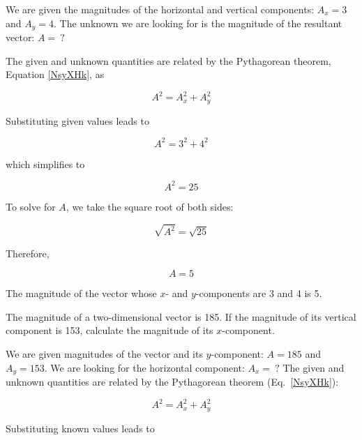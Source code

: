 \documentclass[main.tex]{subfiles}
\begin{document}
\Solution We are given the magnitudes of the horizontal and vertical components: $A_x = 3$ and $A_y = 4$. The unknown we are looking for is the magnitude of the resultant vector: $A =\ ?$

\vspace{1em}

The given and unknown quantities are related by the Pythagorean theorem, Equation \eqref{NsyXHk}, as

\begin{equation*}
    A^2 = A_x^2 + A_y^2
\end{equation*}

Substituting given values leads to 

\begin{equation*}
    A^2 = 3^2 + 4^2
\end{equation*}

which simplifies to

\begin{equation*}
    A^2 = 25
\end{equation*}

To solve for $A$, we take the square root of both sides:

\begin{equation*}
    \sqrt{A^2} = \sqrt{25}
\end{equation*}

Therefore, 

\begin{equation*}
    A = 5
\end{equation*}

The magnitude of the vector whose $x$- and $y$-components are 3 and 4 is 5. 

\solutionEnd

\begin{example}
    The magnitude of a two-dimensional vector is 185. If the magnitude of its vertical component is 153, calculate the magnitude of its $x$-component. 
\end{example}

\Solution We are given magnitudes of the vector and its $y$-component: $A = 185$ and $A_y = 153$. We are looking for the horizontal component: $A_x =\ ?$ The given and unknown quantities are related by the Pythagorean theorem (Eq.~\ref{NsyXHk}):

\begin{equation*}
    A^2 = A_x^2 + A_y^2
\end{equation*}

Substituting known values leads to 
\end{document}
